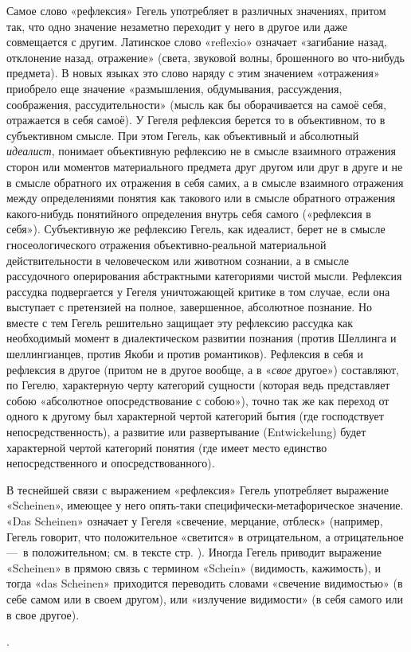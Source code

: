 {Самое слово «рефлексия» Гегель употребляет в различных значениях, притом
так, что одно значение незаметно переходит у него в другое или даже
совмещается с другим. Латинское слово «reflexio» означает «загибание назад,
отклонение назад, отражение» (света, звуковой волны, брошенного во
что-нибудь предмета). В новых языках это слово наряду с этим значением
«отражения» приобрело еще значение «размышления, обдумывания, рассуждения,
соображения, рассудительности» (мысль как бы оборачивается на самоё себя,
отражается в себя самоё). У Гегеля рефлексия берется то в объективном, то в
субъективном смысле. При этом Гегель, как объективный и абсолютный
{\em идеалист}, понимает объективную рефлексию не в смысле взаимного
отражения сторон или моментов материального предмета друг другом или друг в
друге и не в смысле обратного их отражения в себя самих, а в смысле
взаимного отражения между определениями понятия как такового или в смысле
обратного отражения какого-нибудь понятийного определения внутрь себя
самого («рефлексия в себя»). Субъективную же рефлексию Гегель, как
идеалист, берет не в смысле гносеологического отражения объективно-реальной
материальной действительности в человеческом или животном сознании, а в
смысле рассудочного оперирования абстрактными категориями чистой мысли.
Рефлексия рассудка подвергается у Гегеля уничтожающей критике в том случае,
если она выступает с претензией на полное, завершенное, абсолютное
познание. Но вместе с тем Гегель решительно защищает эту рефлексию рассудка
как необходимый момент в диалектическом развитии познания (против Шеллинга
и шеллингианцев, против Якоби и против романтиков). Рефлексия в себя и
рефлексия в другое (притом не в другое вообще, а в «{\em свое} другое»)
составляют, по Гегелю, характерную черту категорий сущности (которая ведь
представляет собою «абсолютное опосредствование с собою»), точно так же как
переход от одного к другому был характерной чертой категорий бытия (где
господствует непосредственность), а развитие или развертывание
(Entwickelung) будет характерной чертой категорий понятия (где имеет место
единство непосредственного и опосредствованного).

В теснейшей связи с выражением «рефлексия» Гегель употребляет выражение
«Scheinen», имеющее у него опять-таки специфически-метафорическое значение.
«Das Scheinen» означает у Гегеля «свечение, мерцание, отблеск» (например,
Гегель говорит, что положительное «светится» в отрицательном, а
отрицательное —~в положительном; см. в тексте стр. \pageref{scheinen}).
Иногда Гегель приводит выражение «Scheinen» в прямою связь с термином
«Schein» (видимость, кажимость), и тогда «das Scheinen» приходится
переводить словами «свечение видимостью» (в себе самом или в своем другом),
или «излучение видимости» (в себя самого или в свое другое).}.
